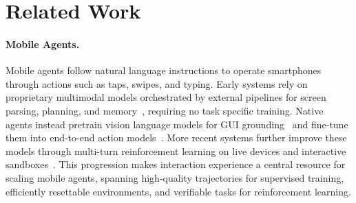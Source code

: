 
\section{Related Work}
\label{sec:related}

\paragraph{Mobile Agents.} 
Mobile agents follow natural language instructions to operate smartphones through actions such as taps, swipes, and typing.
Early systems rely on proprietary multimodal models orchestrated by external pipelines for screen parsing, planning, and memory~\citep{zhang2025appagent, wang2024mobile}, requiring no task specific training.
Native agents instead pretrain vision language models for GUI grounding~\citep{cheng2024seeclick, hong2024cogagent, wu2025atlas} and fine-tune them into end-to-end action models~\citep{qin2025ui, liu2024autoglm, ye2025mobile}.
More recent systems further improve these models through multi-turn reinforcement learning on live devices and interactive sandboxes~\citep{wang2025ui, zhou2025mai, team2026ui, xu2026mobile, gao2026ui}.
This progression makes interaction experience a central resource for scaling mobile agents, spanning high-quality trajectories for supervised training, efficiently resettable environments, and verifiable tasks for reinforcement learning.

